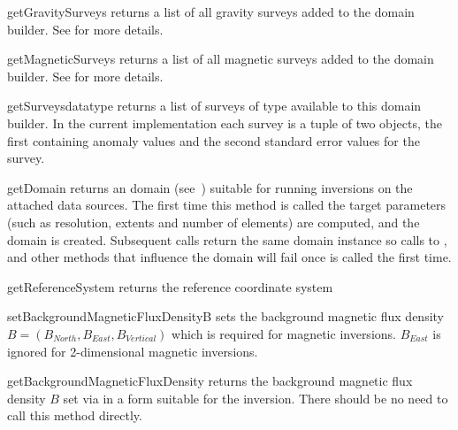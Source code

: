 \begin{methoddesc}[DomainBuilder]{getGravitySurveys}{}
returns a list of all gravity surveys added to the domain builder. See
 for more details.
\end{methoddesc}

\begin{methoddesc}[DomainBuilder]{getMagneticSurveys}{}
returns a list of all magnetic surveys added to the domain builder. See
 for more details.
\end{methoddesc}

\begin{methoddesc}[DomainBuilder]{getSurveys}{datatype}
returns a list of surveys of type  available to this domain
builder. In the current implementation each survey is a tuple of two \Data
objects, the first containing anomaly values and the second standard error
values for the survey.
\end{methoddesc}

\begin{methoddesc}[DomainBuilder]{getDomain}{}
returns an \escript domain (see~\cite{ESCRIPT}) suitable for running inversions
on the attached data sources.
The first time this method is called the target parameters (such as resolution,
extents and number of elements) are computed, and the domain is created.
Subsequent calls return the same domain instance so calls to
,  and other methods that influence
the domain will fail once  is called the first time.
\end{methoddesc}

\begin{methoddesc}[DomainBuilder]{getReferenceSystem}{}
returns the reference coordinate system
\end{methoddesc}

\begin{methoddesc}[DomainBuilder]{setBackgroundMagneticFluxDensity}{B}
sets the background magnetic flux density $B=(B_{North},B_{East},B_{Vertical})$
which is required for magnetic inversions.
$B_{East}$ is ignored for 2-dimensional magnetic inversions.
\end{methoddesc}

\begin{methoddesc}[DomainBuilder]{getBackgroundMagneticFluxDensity}{}
returns the background magnetic flux density $B$ set via
 in a form suitable for the inversion.
There should be no need to call this method directly.
\end{methoddesc}

